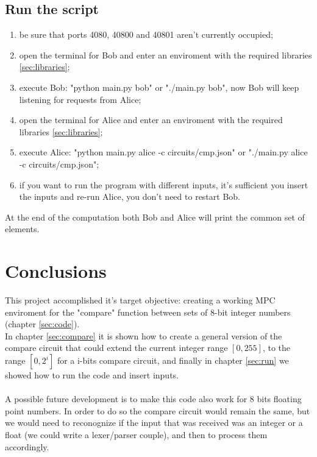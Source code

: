 \documentclass[12pt, letterpaper]{article}
\begin{document}
\subsection{Run the script}
\begin{enumerate}
    \item be sure that ports 4080, 40800 and 40801 aren't currently occupied;
    \item open the terminal for Bob and enter an enviroment with the required libraries \ref{sec:libraries};
    \item execute Bob: "python main.py bob" or "./main.py bob", now Bob will keep listening for requests from Alice;
    \item open the terminal for Alice and enter an enviroment with the required libraries \ref{sec:libraries};
    \item execute Alice: "python main.py alice -c circuits/cmp.json" or  "./main.py alice -c circuits/cmp.json";
    \item if you want to run the program with different inputs, it's sufficient you insert the inputs and re-run Alice, you don't need to restart Bob.
\end{enumerate}
At the end of the computation both Bob and Alice will print the common set of elements.

\section{Conclusions}
This project accomplished it's target objective: creating a working MPC enviroment for the "compare" function between sets of 8-bit integer numbers (chapter \ref{sec:code}).\\
In chapter \ref{sec:compare} it is shown how to create a general version of the compare circuit that could extend the current integer range $[0,255]$, to the range $[0,2^i]$ for a i-bits compare circuit, and finally in chapter \ref{sec:run} we showed how to run the code and insert inputs.
\\
\\
A possible future development is to make this code also work for 8 bits floating point numbers. In order to do so the compare circuit would remain the same, but we would need to reconognize if the input that was received was an integer or a float (we could write a lexer/parser couple), and then to process them accordingly.
\end{document}

